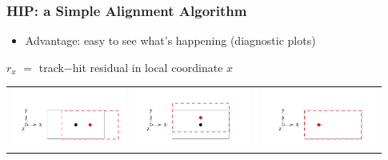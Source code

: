 \documentclass[compress]{beamer}
\begin{document}
\begin{frame}
\frametitle{HIP: a Simple Alignment Algorithm}

\begin{itemize}
\item Advantage: easy to see what's happening (diagnostic plots)
\end{itemize}

\vspace{0.3 cm}
{\small $r_x$ $=$ track$-$hit residual in local coordinate $x$}

\vspace{-0.75 cm}
\begin{center}
\begin{tabular}{p{0.31\linewidth} p{0.31\linewidth} p{0.31\linewidth}}
  \begin{minipage}{\linewidth}
    \includegraphics[width=\linewidth]{dof_x}
  \end{minipage} &
  \begin{minipage}{\linewidth}
    \includegraphics[width=\linewidth]{dof_y}
  \end{minipage} &
  \begin{minipage}{\linewidth}
    \includegraphics[width=\linewidth]{dof_z}

\end{minipage}
\end{tabular}
\end{center}
\end{frame}
\end{document}
